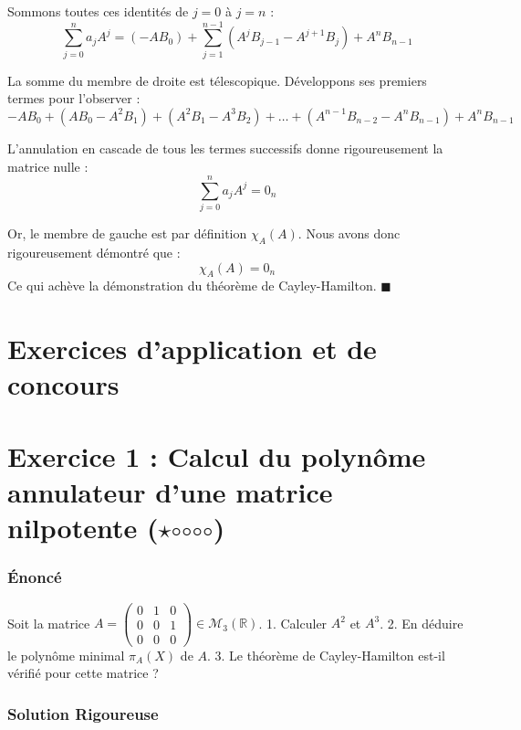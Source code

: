 \documentclass[11pt,a4paper]{article}
\begin{document}
Sommons toutes ces identités de $j=0$ à $j=n$ :
$$\sum_{j=0}^n a_j A^j = (-A B_0) + \sum_{j=1}^{n-1} (A^j B_{j-1} - A^{j+1} B_j) + A^n B_{n-1}$$

La somme du membre de droite est télescopique. Développons ses premiers termes pour l'observer :
$$-A B_0 + (A B_0 - A^2 B_1) + (A^2 B_1 - A^3 B_2) + \dots + (A^{n-1} B_{n-2} - A^n B_{n-1}) + A^n B_{n-1}$$

L'annulation en cascade de tous les termes successifs donne rigoureusement la matrice nulle :
$$\sum_{j=0}^n a_j A^j = 0_n$$

Or, le membre de gauche est par définition $\chi_A(A)$. Nous avons donc rigoureusement démontré que :
$$\chi_A(A) = 0_n$$
Ce qui achève la démonstration du théorème de Cayley-Hamilton. $\blacksquare$

\part{Exercices d'application et de concours}


\part{Exercice 1 : Calcul du polynôme annulateur d'une matrice nilpotente ($\star$$\circ$$\circ$$\circ$$\circ$)}

\section{Énoncé}

Soit la matrice $A = \begin{pmatrix} 0 & 1 & 0 \\ 0 & 0 & 1 \\ 0 & 0 & 0 \end{pmatrix} \in \mathcal{M}_3(\mathbb{R})$.
1. Calculer $A^2$ et $A^3$.
2. En déduire le polynôme minimal $\pi_A(X)$ de $A$.
3. Le théorème de Cayley-Hamilton est-il vérifié pour cette matrice ?

\section{Solution Rigoureuse}
\end{document}
